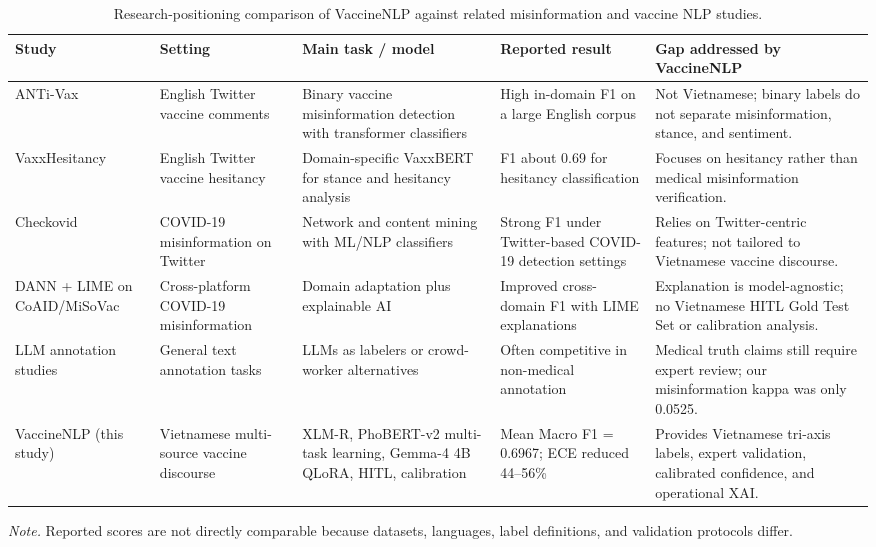 \documentclass[runningheads]{llncs}
\begin{document}
\begin{table}[t]
\caption{Research-positioning comparison of VaccineNLP against related misinformation and vaccine NLP studies.}\label{tab:literature}
\centering
\scriptsize
\setlength{\tabcolsep}{1.8pt}
\renewcommand{\arraystretch}{1.08}
\begin{tabular}{@{}>{\raggedright\arraybackslash}p{}>{\raggedright\arraybackslash}p{}>{\raggedright\arraybackslash}p{}>{\raggedright\arraybackslash}p{}>{\raggedright\arraybackslash}p{}@{}}
\hline
Study & Setting & Main task / model & Reported result & Gap addressed by VaccineNLP\\
\hline
ANTi-Vax \cite{hayawi2022antivax} & English Twitter vaccine comments & Binary vaccine misinformation detection with transformer classifiers & High in-domain F1 on a large English corpus & Not Vietnamese; binary labels do not separate misinformation, stance, and sentiment.\\
VaxxHesitancy \cite{mu2023vaxxhesitancy} & English Twitter vaccine hesitancy & Domain-specific VaxxBERT for stance and hesitancy analysis & F1 about 0.69 for hesitancy classification & Focuses on hesitancy rather than medical misinformation verification.\\
Checkovid \cite{dadgar2021checkovid} & COVID-19 misinformation on Twitter & Network and content mining with ML/NLP classifiers & Strong F1 under Twitter-based COVID-19 detection settings & Relies on Twitter-centric features; not tailored to Vietnamese vaccine discourse.\\
DANN + LIME on CoAID/MiSoVac \cite{joshi2022explainable} & Cross-platform COVID-19 misinformation & Domain adaptation plus explainable AI & Improved cross-domain F1 with LIME explanations & Explanation is model-agnostic; no Vietnamese HITL Gold Test Set or calibration analysis.\\
LLM annotation studies \cite{gilardi2023chatgpt} & General text annotation tasks & LLMs as labelers or crowd-worker alternatives & Often competitive in non-medical annotation & Medical truth claims still require expert review; our misinformation kappa was only 0.0525.\\
VaccineNLP (this study) & Vietnamese multi-source vaccine discourse & XLM-R, PhoBERT-v2 multi-task learning, Gemma-4 4B QLoRA, HITL, calibration & Mean Macro F1 = 0.6967; ECE reduced 44--56\% & Provides Vietnamese tri-axis labels, expert validation, calibrated confidence, and operational XAI.\\
\hline
\end{tabular}
\vspace{2pt}
\parbox{\textwidth}{\footnotesize\emph{Note.} Reported scores are not directly comparable because datasets, languages, label definitions, and validation protocols differ.}
\end{table}
\end{document}
